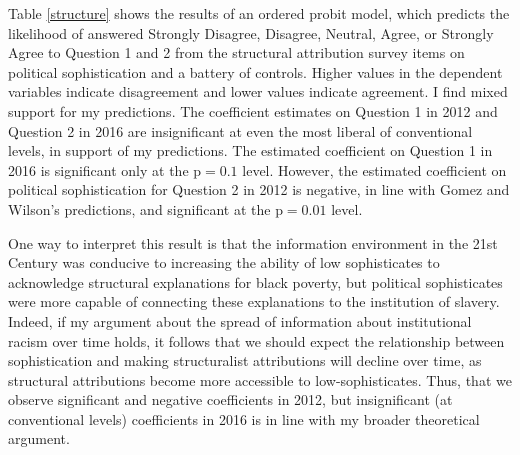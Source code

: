 \documentclass[12pt]{paper}
\begin{document}
Table \ref{structure} shows the results of an ordered probit model, which predicts the likelihood of answered Strongly Disagree, Disagree, Neutral, Agree, or Strongly Agree to Question 1 and 2 from the structural attribution survey items on political sophistication and a battery of controls. Higher values in the dependent variables indicate disagreement and lower values indicate agreement. I find mixed support for my predictions. The coefficient estimates on Question 1 in 2012 and Question 2 in 2016 are insignificant at even the most liberal of conventional levels, in support of my predictions. The estimated coefficient on Question 1 in 2016 is significant only at the p$=0.1$ level. However, the estimated coefficient on political sophistication for Question 2 in 2012 is negative, in line with Gomez and Wilson's predictions, and significant at the p$=0.01$ level.

One way to interpret this result is that the information environment in the 21st Century was conducive to increasing the ability of low sophisticates to acknowledge structural explanations for black poverty, but political sophisticates were more capable of connecting these explanations to the institution of slavery. Indeed, if my argument about the spread of information about institutional racism over time holds, it follows that we should expect the relationship between sophistication and making structuralist attributions will decline over time, as structural attributions become more accessible to low-sophisticates. Thus, that we observe significant and negative coefficients in 2012, but insignificant (at conventional levels) coefficients in 2016 is in line with my broader theoretical argument.
\end{document}
